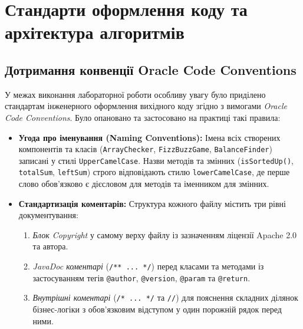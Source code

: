 \section{Стандарти оформлення коду та архітектура алгоритмів}

\subsection{Дотримання конвенції Oracle Code Conventions}

У межах виконання лабораторної роботи особливу увагу було приділено стандартам 
інженерного оформлення вихідного коду згідно з вимогами \textit{Oracle Code Conventions}. 
Було опановано та застосовано на практиці такі правила:

\begin{itemize}
    \item \textbf{Угода про іменування (Naming Conventions):} 
    Імена всіх створених компонентів та класів (\texttt{ArrayChecker}, \texttt{FizzBuzzGame}, \texttt{BalanceFinder}) 
    записані у стилі \texttt{UpperCamelCase}. Назви методів та змінних (\texttt{isSortedUp()}, \texttt{totalSum}, \texttt{leftSum}) 
    строго відповідають стилю \texttt{lowerCamelCase}, де перше слово обов'язково є дієсловом для методів та іменником для змінних.
    \item \textbf{Стандартизація коментарів:} Структура кожного файлу містить три рівні документування:
    \begin{enumerate}
        \item \textit{Блок Copyright} у самому верху файлу із зазначенням ліцензії Apache 2.0 та автора.
        \item \textit{JavaDoc коментарі} (\texttt{/** ... */}) перед класами та методами із 
        застосуванням тегів \texttt{@author}, \texttt{@version}, \texttt{@param} та \texttt{@return}.
        \item \textit{Внутрішні коментарі} (\texttt{/* ... */} та \texttt{//}) для 
        пояснення складних ділянок бізнес-логіки з обов'язковим відступом у один порожній рядок перед ними.
    \end{enumerate}
\end{itemize}
